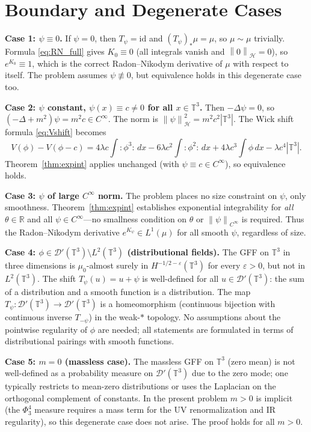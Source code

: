 \documentclass[11pt,a4paper]{article}
\theoremstyle{definition}
\newcommand{\T}{\mathbb{T}}
\newcommand{\R}{\mathbb{R}}
\newcommand{\Dc}{\mathcal{D}}
\newcommand{\Hc}{\mathcal{H}}
\newcommand{\norm}[1]{\left\|#1\right\|}
\newcommand{\wick}[1]{:\!#1\!:}
\begin{document}
\section{Boundary and Degenerate Cases}

\textbf{Case 1: $\psi\equiv 0$.}
If $\psi=0$, then $T_\psi=\mathrm{id}$ and $(T_\psi)_*\mu = \mu$, so $\mu\sim\mu$ trivially.
Formula \eqref{eq:RN_full} gives $K_0\equiv 0$ (all integrals vanish and $\norm{0}_\Hc=0$), so $e^{K_0}\equiv 1$, which is the correct Radon--Nikodym derivative of $\mu$ with respect to itself.
The problem assumes $\psi\not\equiv 0$, but equivalence holds in this degenerate case too.

\textbf{Case 2: $\psi$ constant, $\psi(x)\equiv c\ne 0$ for all $x\in\T^3$.}
Then $-\Delta\psi = 0$, so $(-\Delta+m^2)\psi = m^2 c\in C^\infty$.
The norm is $\norm{\psi}_\Hc^2 = m^2c^2|\T^3|$.
The Wick shift formula \eqref{eq:Vshift} becomes
\[
V(\phi)-V(\phi-c) = 4\lambda c\!\int\wick{\phi^3}\,dx - 6\lambda c^2\!\int\wick{\phi^2}\,dx + 4\lambda c^3\!\int\phi\,dx - \lambda c^4|\T^3|.
\]
Theorem~\ref{thm:expint} applies unchanged (with $\psi\equiv c\in C^\infty$), so equivalence holds.

\textbf{Case 3: $\psi$ of large $C^\infty$ norm.}
The problem places no size constraint on $\psi$, only smoothness.
Theorem~\ref{thm:expint} establishes exponential integrability for \emph{all} $\theta\in\R$ and all $\psi\in C^\infty$---no smallness condition on $\theta$ or $\norm{\psi}_{C^\infty}$ is required.
Thus the Radon--Nikodym derivative $e^{K_\psi}\in L^1(\mu)$ for all smooth $\psi$, regardless of size.

\textbf{Case 4: $\phi\in\Dc'(\T^3)\setminus L^2(\T^3)$ (distributional fields).}
The GFF on $\T^3$ in three dimensions is $\mu_0$-almost surely in $H^{-1/2-\varepsilon}(\T^3)$ for every $\varepsilon>0$, but not in $L^2(\T^3)$.
The shift $T_\psi(u) = u+\psi$ is well-defined for all $u\in\Dc'(\T^3)$: the sum of a distribution and a smooth function is a distribution.
The map $T_\psi:\Dc'(\T^3)\to\Dc'(\T^3)$ is a homeomorphism (continuous bijection with continuous inverse $T_{-\psi}$) in the weak-$*$ topology.
No assumptions about the pointwise regularity of $\phi$ are needed; all statements are formulated in terms of distributional pairings with smooth functions.

\textbf{Case 5: $m=0$ (massless case).}
The massless GFF on $\T^3$ (zero mean) is not well-defined as a probability measure on $\Dc'(\T^3)$ due to the zero mode; one typically restricts to mean-zero distributions or uses the Laplacian on the orthogonal complement of constants.
In the present problem $m>0$ is implicit (the $\Phi^4_3$ measure requires a mass term for the UV renormalization and IR regularity), so this degenerate case does not arise.
The proof holds for all $m>0$.
\end{document}
